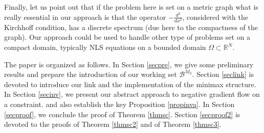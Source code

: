 \documentclass[10pt,a4paper]{article}
\theoremstyle{definition} \theoremstyle{remark}
\numberwithin{equation}{section}
\newcommand{\R}{\mathbb{R}}
\newcommand{\B}{\mathcal{B}}
\begin{document}
Finally, let us point out that if the problem here is set on a metric graph what is really essential in our approach is that the operator $-\frac{d^2}{dx^2}$, considered with the Kirchhoff condition, has a discrete spectrum (due here to the compactness of the graph). Our approach could be used to handle other type of problems set on a compact domain, typically  NLS equations on a bounded domain $\Omega \subset \R^N$. \smallskip

The paper is organized as follows. In Section \ref{secpre}, we give some preliminary results and prepare the introduction of our working set $\B^{M_2}$. Section \ref{seclink} is devoted to introduce our link and the implementation of the minimax structure.  In Section \ref{secinv}, we present our abstract approach to negative gradient flow on a constraint. and also establish the key Proposition \ref{propinva}. In Section \ref{secproof}, we conclude the proof of Theorem \ref{thmsc}. Section \ref{secproof2} is devoted to the proofs of Theorem \ref{thmsc2} and of Theorem \ref{thmsc3}.
\end{document}
